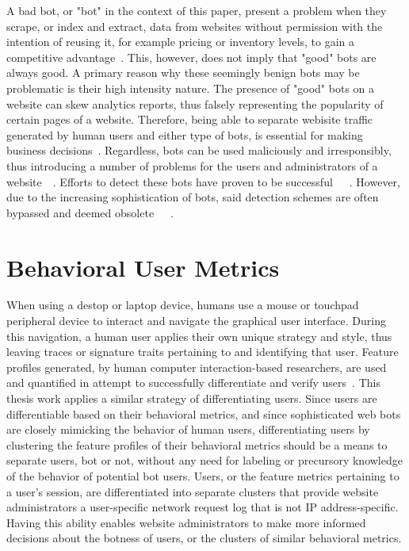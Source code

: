 A bad bot, or "bot" in the context of this paper, present a problem when they scrape, or index and extract, data from websites without permission with the intention of reusing it, for example pricing or inventory levels, to gain a competitive advantage~\cite{bad_bot_report}.
This, however, does not imply that "good" bots are always good.
A primary reason why these seemingly benign bots may be problematic is their high intensity nature.
The presence of "good" bots on a website can skew analytics reports, thus falsely representing the popularity of certain pages of a website.
Therefore, being able to separate webisite traffic generated by human users and either type of bots, is essential for making business decisions~\cite{bad_bot_report}.
Regardless, bots can be used maliciously and irresponsibly, thus introducing a number of problems for the users and administrators of a website~\cite{1ee426975c3d46d2ba6ef5c2d76384c5}~\cite{bad_bot_report}.
Efforts to detect these bots have proven to be successful~\cite{akamai_bot_detection}~\cite{Hamidzadeh2018}~\cite{ZABIHIMAYVAN2017129}.
However, due to the increasing sophistication of bots, said detection schemes are often bypassed and deemed obsolete~\cite{ROVETTA2020102577}~\cite{STEVANOVIC2013698}~\cite{10.1109/DSN.2013.6575366}.

\section{Behavioral User Metrics}\label{sec:behavrioral-user-metrics}
When using a destop or laptop device, humans use a mouse or touchpad peripheral device to interact and navigate the graphical user interface.
During this navigation, a human user applies their own unique strategy and style, thus leaving traces or signature traits pertaining to and identifying that user.
Feature profiles generated, by human computer interaction-based researchers, are used and quantified in attempt to successfully differentiate and verify users~\cite{human_computer_interaction_based_intrusion_detection}.
This thesis work applies a similar strategy of differentiating users.
Since users are differentiable based on their behavioral metrics, and since sophisticated web bots are closely mimicking the behavior of human users, differentiating users by clustering the feature profiles of their behavioral metrics should be a means to separate users, bot or not, without any need for labeling or precursory knowledge of the behavior of potential bot users.
Users, or the feature metrics pertaining to a user's session, are differentiated into separate clusters that provide website administrators a user-specific network request log that is not IP address-specific.
Having this ability enables website administrators to make more informed decisions about the botness of users, or the clusters of similar behavioral metrics.

